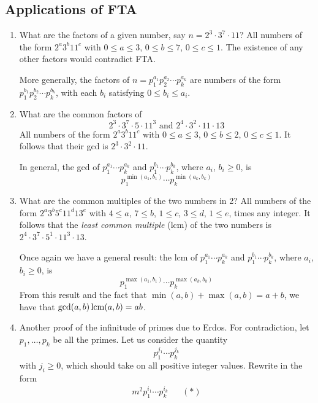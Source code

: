 \documentclass{../../template/note}
\begin{document}
    \subsection{Applications of FTA}

    \begin{enumerate}[label=\protect\circled{\arabic*}]
        \item What are the factors of a given number, say \(n = 2^3 \cdot 3^7 \cdot 11\)? All numbers of the form \(2^a 3^b 11^c\) with \(0 \leq a \leq 3\), \(0 \leq b \leq 7\), \(0 \leq c \leq 1\). The existence of any other factors would contradict FTA.
        
        More generally, the factors of \(n = p_1^{a_1}p_2^{a_2}\cdots p_k^{a_k}\) are numbers of the form \(p_1^{b_1}p_2^{b_2}\cdots p_k^{b_k}\), with each \(b_i\) satisfying \(0 \leq b_i \leq a_i\).

        \item What are the common factors of
        \[
            2^3 \cdot 3^7 \cdot 5 \cdot 11^3 \text{ and } 2^4 \cdot 3^2 \cdot 11 \cdot 13
        \]
        All numbers of the form \(2^a 3^b 11^c\) with \(0 \leq a \leq 3\), \(0 \leq b \leq 2\), \(0 \leq c \leq 1\). It follows that their gcd is \(2^3 \cdot 3^2 \cdot 11\).

        In general, the gcd of \(p_1^{a_1}\cdots p_k^{a_k}\) and \(p_1^{b_1} \cdots p_k^{b_k}\), where \(a_i\), \(b_i \geq 0\), is
        \[
            p_1^{\min(a_1,b_1)} \cdots p_k^{\min(a_k, b_k)}
        \]

        \item What are the common multiples of the two numbers in 2? All numbers of the form \(2^a 3^b 5^c 11^d 13^e\) with \(4 \leq a\), \(7 \leq b\), \(1 \leq c\), \(3 \leq d\), \(1 \leq e\), times any integer. It follows that the \emph{least common multiple} (lcm) of the two numbers is \(2^4 \cdot 3^7 \cdot 5^1 \cdot 11^3 \cdot 13\).
        
        Once again we have a general result: the lcm of \(p_1^{a_1}\cdots p_k^{a_k}\) and \(p_1^{b_1} \cdots p_k^{b_k}\), where \(a_i\), \(b_i \geq 0\), is
        \[
            p_1^{\max(a_1,b_1)} \cdots p_k^{\max(a_k, b_k)}
        \]
        From this result and the fact that \(\min(a, b) + \max(a, b) = a + b\), we have that \(\gcd(a,b)\operatorname*{lcm}(a,b) = ab\).

        \item Another proof of the infinitude of primes due to Erdos. For contradiction, let \(p_1, \dots, p_k\) be all the primes. Let us consider the quantity
        \[ 
            p_1^{j_1} \cdots p_k^{j_k}
        \]
        with \(j_i \geq 0\), which should take on all positive integer values. Rewrite in the form
        \begin{align*}
            m^2 p_1^{i_1} \cdots p_k^{i_k} && (*)       
        \end{align*}
        

\end{enumerate}
\end{document}
